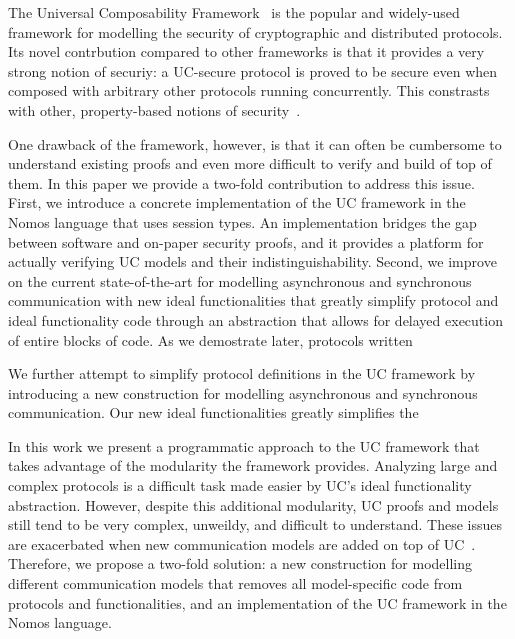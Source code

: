 The Universal Composability Framework~\cite{uc} is the popular and widely-used framework for modelling the security of cryptographic and distributed protocols.
Its novel contrbution compared to other frameworks is that it provides a very strong notion of securiy: a UC-secure protocol is proved to be secure even when composed with arbitrary other protocols running concurrently.
This constrasts with other, property-based notions of security~.

One drawback of the framework, however, is that it can often be cumbersome to understand existing proofs and even more difficult to verify and build of top of them.
In this paper we provide a two-fold contribution to address this issue.
First, we introduce a concrete implementation of the UC framework in the Nomos language that uses session types. 
An implementation bridges the gap between software and on-paper security proofs, and it provides a platform for actually verifying UC models and their indistinguishability. 
Second, we improve on the current state-of-the-art for modelling asynchronous and synchronous communication with new ideal functionalities that greatly simplify protocol and ideal functionality code through an abstraction that allows for delayed execution of entire blocks of code.
As we demostrate later, protocols written 



We further attempt to simplify protocol definitions in the UC framework by introducing a new construction for modelling asynchronous and synchronous communication.
Our new ideal functionalities greatly simplifies the 

In this work we present a programmatic approach to the UC framework that takes advantage of the modularity the framework provides. 
Analyzing large and complex protocols is a difficult task made easier by UC's ideal functionality abstraction. 
However, despite this additional modularity, UC proofs and models still tend to be very complex, unweildy, and difficult to understand.
These issues are exacerbated when new communication models are added on top of UC~\cite{katz, etc}.
Therefore, we propose a two-fold solution: a new construction for modelling different communication models that removes all model-specific code from protocols and functionalities, and an implementation of the UC framework in the Nomos language. 



